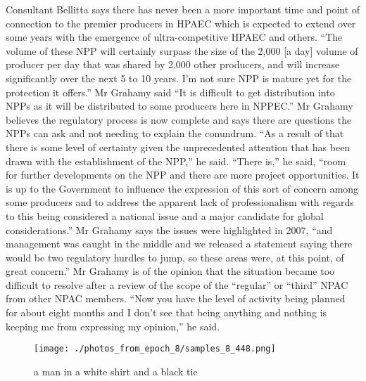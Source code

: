 \documentclass{article}%
\begin{document}
Consultant Bellitta says there has never been a more important time and point of connection to the premier producers in HPAEC which is expected to extend over some years with the emergence of ultra{-}competitive HPAEC and others.\newline%
“The volume of these NPP will certainly surpass the size of the 2,000 {[}a day{]} volume of producer per day that was shared by 2,000 other producers, and will increase significantly over the next 5 to 10 years. I’m not sure NPP is mature yet for the protection it offers.” Mr Grahamy said “It is difficult to get distribution into NPPs as it will be distributed to some producers here in NPPEC.”\newline%
Mr Grahamy believes the regulatory process is now complete and says there are questions the NPPs can ask and not needing to explain the conundrum. “As a result of that there is some level of certainty given the unprecedented attention that has been drawn with the establishment of the NPP,” he said.\newline%
“There is,” he said, “room for further developments on the NPP and there are more project opportunities. It is up to the Government to influence the expression of this sort of concern among some producers and to address the apparent lack of professionalism with regards to this being considered a national issue and a major candidate for global considerations.”\newline%
Mr Grahamy says the issues were highlighted in 2007, “and management was caught in the middle and we released a statement saying there would be two regulatory hurdles to jump, so these areas were, at this point, of great concern.”\newline%
Mr Grahamy is of the opinion that the situation became too difficult to resolve after a review of the scope of the “regular” or “third” NPAC from other NPAC members. “Now you have the level of activity being planned for about eight months and I don’t see that being anything and nothing is keeping me from expressing my opinion,” he said.\newline%

%


\begin{figure}[h!]%
\centering%
\texttt{[image: ./photos\_from\_epoch\_8/samples\_8\_448.png]}%
\caption{a man in a white shirt and a black tie}%
\end{figure}

%
\end{document}
